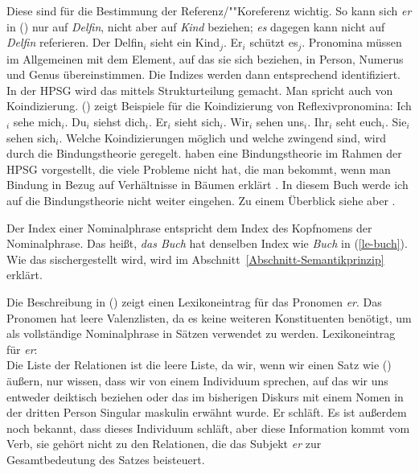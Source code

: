 Diese sind für die Bestimmung der Referenz/""Koreferenz wichtig. So kann
sich \emph{er} in () nur auf \emph{Delfin}, nicht aber auf \emph{Kind}
beziehen; \emph{es} dagegen kann nicht auf \emph{Delfin} referieren.
\ea
Der Delfin$_i$ sieht ein Kind$_j$. Er$_i$ schützt es$_j$.
\z
Pronomina müssen im Allgemeinen mit dem Element, auf das sie sich beziehen, in Person,
Numerus und Genus übereinstimmen. Die Indizes werden dann entsprechend identifiziert.
In der HPSG wird das mittels Strukturteilung gemacht. Man spricht auch von Koindizierung.
() zeigt Beispiele für die Koindizierung von Reflexivpronomina:
\eal
\ex Ich$_i$ sehe mich$_i$.
\ex Du$_i$ siehst dich$_i$.
\ex Er$_i$ sieht sich$_i$.
\ex Wir$_i$ sehen uns$_i$.
\ex Ihr$_i$ seht euch$_i$.
\ex Sie$_i$ sehen sich$_i$.
\zl
Welche Koindizierungen möglich und welche zwingend sind, wird durch die Bindungstheorie
geregelt. \citet{PS92a,ps2} haben eine Bindungstheorie im Rahmen der HPSG vorgestellt, die viele Probleme
nicht hat, die man bekommt, wenn man Bindung in Bezug auf Verhältnisse in Bäumen erklärt \citep{Wechsler99a,MS98a}. In diesem Buch werde
ich auf die Bindungstheorie nicht weiter eingehen. Zu einem Überblick siehe aber
.

Der Index einer Nominalphrase entspricht dem Index des Kopfnomens der Nominalphrase. Das heißt,
\emph{das Buch} hat denselben Index wie \emph{Buch} in (\ref{le-buch}). Wie das sischergestellt
wird, wird im Abschnitt~\ref{Abschnitt-Semantikprinzip} erklärt.

Die Beschreibung in () zeigt einen Lexikoneintrag für das Pronomen \emph{er}. Das Pronomen
hat leere Valenzlisten, da es keine weiteren Konstituenten benötigt, um als vollständige
Nominalphrase in Sätzen verwendet zu werden.
\eas
\label{le-er}%
Lexikoneintrag für \emph{er}:\\
\zs
Die Liste der Relationen ist die leere Liste, da wir, wenn wir einen Satz wie () äußern, nur
wissen, dass wir von einem Individuum sprechen, auf das wir uns entweder deiktisch beziehen oder das
im bisherigen Diskurs mit einem Nomen in der dritten Person Singular maskulin erwähnt wurde.
\ea
Er schläft.
\z
Es ist außerdem noch bekannt, dass dieses Individuum schläft, aber diese Information kommt vom Verb, sie
gehört nicht zu den Relationen, die das Subjekt \emph{er} zur Gesamtbedeutung des Satzes
beisteuert. 

